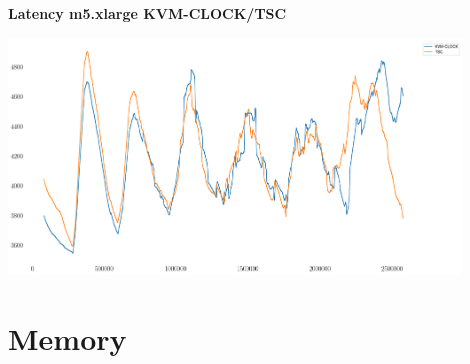 \documentclass[usenames,dvipsnames, 18pt, compress, aspectratio=169]{beamer}
\begin{document}
\begin{frame}
    \frametitle{}
    \begin{center}
    \textbf{Latency m5.xlarge KVM-CLOCK/TSC}

        \includegraphics[width=0.9\textwidth,center]{m5_clock_source.png}

    \end{center}
\end{frame}

\fontsize{13pt}{14}\selectfont
\section{Memory}
\fontsize{17pt}{18}\selectfont
\end{document}

